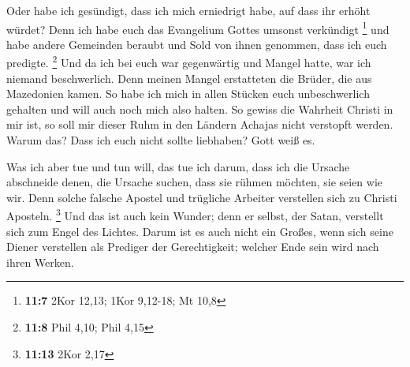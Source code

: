  Oder habe ich gesündigt, dass ich mich erniedrigt habe,
auf dass ihr erhöht würdet? Denn ich habe euch das Evangelium Gottes
umsonst verkündigt \footnote{\textbf{11:7} 2Kor 12,13; 1Kor 9,12-18; Mt
  10,8}  und habe andere Gemeinden beraubt und Sold von
ihnen genommen, dass ich euch predigte. \footnote{\textbf{11:8} Phil
  4,10; Phil 4,15}  Und da ich bei euch war gegenwärtig
und Mangel hatte, war ich niemand beschwerlich. Denn meinen Mangel
erstatteten die Brüder, die aus Mazedonien kamen. So habe ich mich in
allen Stücken euch unbeschwerlich gehalten und will auch noch mich also
halten.  So gewiss die Wahrheit Christi in mir ist, so
soll mir dieser Ruhm in den Ländern Achajas nicht verstopft werden.
 Warum das? Dass ich euch nicht sollte liebhaben? Gott
weiß es.

 Was ich aber tue und tun will, das tue ich darum, dass
ich die Ursache abschneide denen, die Ursache suchen, dass sie rühmen
möchten, sie seien wie wir.  Denn solche falsche Apostel
und trügliche Arbeiter verstellen sich zu Christi Aposteln. \footnote{\textbf{11:13}
  2Kor 2,17}  Und das ist auch kein Wunder; denn er
selbst, der Satan, verstellt sich zum Engel des Lichtes. 
Darum ist es auch nicht ein Großes, wenn sich seine Diener verstellen
als Prediger der Gerechtigkeit; welcher Ende sein wird nach ihren
Werken.

